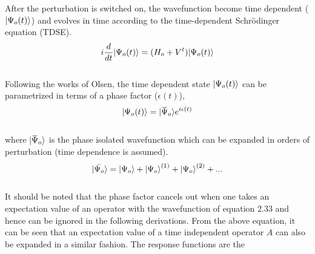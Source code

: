 After the perturbation is switched on, the wavefunction become time dependent 
($| \Psi_o(t) \rangle$) and evolves in time according to the time-dependent
Schr\"odinger equation (TDSE).
\\
\begin{equation}
i\frac{d}{dt}| \Psi_o(t) \rangle = (H_o + V^t)| \Psi_o(t) \rangle
\end{equation}
\\
Following the works of Olsen\cite{Olsen85}, the time dependent state $| \Psi_o(t) \rangle$
can be parametrized in terms of a phase factor ($\epsilon(t)$),
\\
\begin{equation}
\ket{\Psi_o(t)} = \ket{{\overbar{\Psi}_o}}e^{i\epsilon(t)}
\end{equation}
\\
where $\ket{{\overbar{\Psi}_o}}$ is the phase isolated wavefunction which can be expanded 
in orders of perturbation (time dependence is assumed).\\
\begin{equation}
| \bar{\Psi_o} \rangle = | \Psi_o \rangle + {| \Psi_o \rangle}^{(1)}+ {| \Psi_o \rangle}^{(2)} + ...
\end{equation}
\\
It should be noted that the phase factor cancels out when one takes an expectation
value of an operator with the wavefunction of equation 2.33 and hence can be 
ignored in the following derivations.
From the above equation, it can be seen that an expectation value of a time independent
operator $A$ can also be expanded in a similar fashion. The response functions are the 
